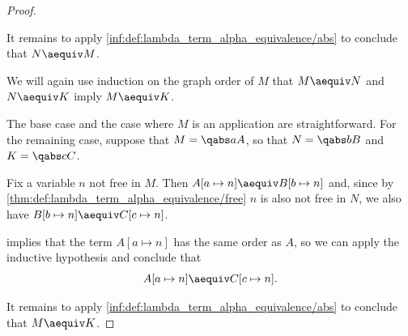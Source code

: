 \begin{proof}
\begin{itemize}
    It remains to apply \ref{inf:def:lambda_term_alpha_equivalence/abs} to conclude that \( N \aequiv M \).
  \end{itemize}

   We will again use induction on the graph order of \( M \) that \( M \aequiv N \) and \( N \aequiv K \) imply \( M \aequiv K \).

  The base case and the case where \( M \) is an application are straightforward. For the remaining case, suppose that \( M = \qabs a A \), so that \( N = \qabs b B \) and \( K = \qabs c C \).

  Fix a variable \( n \) not free in \( M \). Then \( A[a \mapsto n] \aequiv B[b \mapsto n] \) and, since by \cref{thm:def:lambda_term_alpha_equivalence/free} \( n \) is also not free in \( N \), we also have \( B[b \mapsto n] \aequiv C[c \mapsto n] \).

   implies that the term \( A[a \mapsto n] \) has the same order as \( A \), so we can apply the inductive hypothesis and conclude that
  \begin{equation*}
    A[a \mapsto n] \aequiv C[c \mapsto n].
  \end{equation*}

  It remains to apply \ref{inf:def:lambda_term_alpha_equivalence/abs} to conclude that \( M \aequiv K \).
\end{proof}

